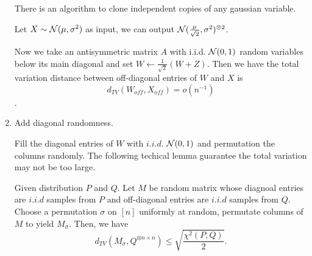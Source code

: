 \begin{enumerate}
        There is an algorithm to clone independent copies of any gaussian variable.
        \begin{thm}
            \label{gauss_clone} 
            Let $X\sim\mathcal{N}(\mu,\sigma^2)$ as input, we can output $\mathcal{N}(\frac{\mu}{\sqrt{2}},\sigma^2)^{\otimes 2}$.
        \end{thm}
        Now we take an antisymmetric matrix $A$ with i.i.d. $\mathcal{N}(0, 1)$ random variables below
        its main diagonal and set $W\leftarrow \frac{1}{\sqrt{2}}(W+Z)$. Then we have the total variation distance between off-diagonal entries of $W$ and $X$ is 
        $$d_{TV}(W_{off},X_{off})=o(n^{-1})$$.

    \item Add diagonal randomness.
        
        Fill the diagonal entries of $W$ with $i.i.d.$ $\mathcal{N}(0,1)$ and permutation the columns randomly. The following techical lemma guarantee the total variation may not be too large.
        \begin{lem}
            \label{off_diag_permut}
            Given distribution $P$ and $Q$. Let $M$ be random matrix whose diagnoal entries are $i.i.d$ samples from $P$ and off-diagonal entries are $i.i.d$ samples from $Q$.
            Choose a permutation $\sigma$ on $[n]$ uniformly at random, permutate columns of $M$ to yield $M_{\sigma}$. Then, we have
            \[
              d_{TV}(M_\sigma,Q^{\otimes n\times n})\le \sqrt{\frac{\chi^2(P,Q)}{2}}.  
            \]
        \end{lem}
\end{enumerate}
